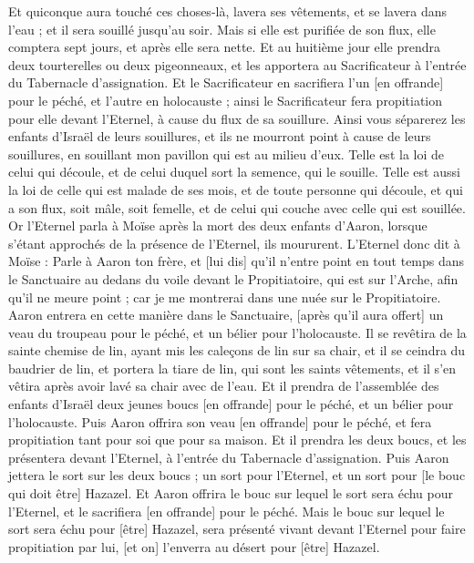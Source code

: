 \begin{multicols}{2}
Et quiconque aura touché ces choses-là, lavera ses vêtements, et se lavera dans l'eau ; et il sera souillé jusqu'au soir.
Mais si elle est purifiée de son flux, elle comptera sept jours, et après elle sera nette.
Et au huitième jour elle prendra deux tourterelles ou deux pigeonneaux, et les apportera au Sacrificateur à l'entrée du Tabernacle d'assignation.
Et le Sacrificateur en sacrifiera l'un [en offrande] pour le péché, et l'autre en holocauste ; ainsi le Sacrificateur fera propitiation pour elle devant l'Eternel, à cause du flux de sa souillure.
Ainsi vous séparerez les enfants d'Israël de leurs souillures, et ils ne mourront point à cause de leurs souillures, en souillant mon pavillon qui est au milieu d'eux.
Telle est la loi de celui qui découle, et de celui duquel sort la semence, qui le souille.
Telle est aussi la loi de celle qui est malade de ses mois, et de toute personne qui découle, et qui a son flux, soit mâle, soit femelle, et de celui qui couche avec celle qui est souillée.
\VerseOne{}Or l'Eternel parla à Moïse après la mort des deux enfants d'Aaron, lorsque s'étant approchés de la présence de l'Eternel, ils moururent.
L'Eternel donc dit à Moïse : Parle à Aaron ton frère, et [lui dis] qu'il n'entre point en tout temps dans le Sanctuaire au dedans du voile devant le Propitiatoire, qui est sur l'Arche, afin qu'il ne meure point ; car je me montrerai dans une nuée sur le Propitiatoire.
Aaron entrera en cette manière dans le Sanctuaire, [après qu'il aura offert] un veau du troupeau pour le péché, et un bélier pour l'holocauste.
Il se revêtira de la sainte chemise de lin, ayant mis les caleçons de lin sur sa chair, et il se ceindra du baudrier de lin, et portera la tiare de lin, qui sont les saints vêtements, et il s'en vêtira après avoir lavé sa chair avec de l'eau.
Et il prendra de l'assemblée des enfants d'Israël deux jeunes boucs [en offrande] pour le péché, et un bélier pour l'holocauste.
Puis Aaron offrira son veau [en offrande] pour le péché, et fera propitiation tant pour soi que pour sa maison.
Et il prendra les deux boucs, et les présentera devant l'Eternel, à l'entrée du Tabernacle d'assignation.
Puis Aaron jettera le sort sur les deux boucs ; un sort pour l'Eternel, et un sort pour [le bouc qui doit être] Hazazel.
Et Aaron offrira le bouc sur lequel le sort sera échu pour l'Eternel, et le sacrifiera [en offrande] pour le péché.
Mais le bouc sur lequel le sort sera échu pour [être] Hazazel, sera présenté vivant devant l'Eternel pour faire propitiation par lui, [et on] l'enverra au désert pour [être] Hazazel.

\end{multicols}

